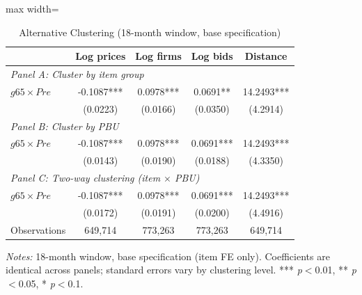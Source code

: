 \begin{table}[htbp]
\centering
\caption{Alternative Clustering (18-month window, base specification)}
\label{tab:altcluster}
\begin{adjustbox}{max width=\textwidth}
\begin{threeparttable}
\small
\begin{tabular}{lcccc}
\toprule
 & Log prices & Log firms & Log bids & Distance \\
\midrule
\multicolumn{5}{l}{\textit{Panel A: Cluster by item group}} \\
$g65 \times Pre$ & -0.1087*** & 0.0978*** & 0.0691** & 14.2493*** \\
 & (0.0223) & (0.0166) & (0.0350) & (4.2914) \\
\midrule
\multicolumn{5}{l}{\textit{Panel B: Cluster by PBU}} \\
$g65 \times Pre$ & -0.1087*** & 0.0978*** & 0.0691*** & 14.2493*** \\
 & (0.0143) & (0.0190) & (0.0188) & (4.3350) \\
\midrule
\multicolumn{5}{l}{\textit{Panel C: Two-way clustering (item $\times$ PBU)}} \\
$g65 \times Pre$ & -0.1087*** & 0.0978*** & 0.0691*** & 14.2493*** \\
 & (0.0172) & (0.0191) & (0.0200) & (4.4916) \\
\midrule
Observations & 649,714 & 773,263 & 773,263 & 649,714 \\
\bottomrule
\end{tabular}
\begin{tablenotes}
\small
\item \textit{Notes:} 18-month window, base specification (item FE only).
Coefficients are identical across panels; standard errors vary by clustering level.
*** \textit{p}$<$0.01, ** \textit{p}$<$0.05, * \textit{p}$<$0.1.
\end{tablenotes}
\end{threeparttable}
\end{adjustbox}
\end{table}
